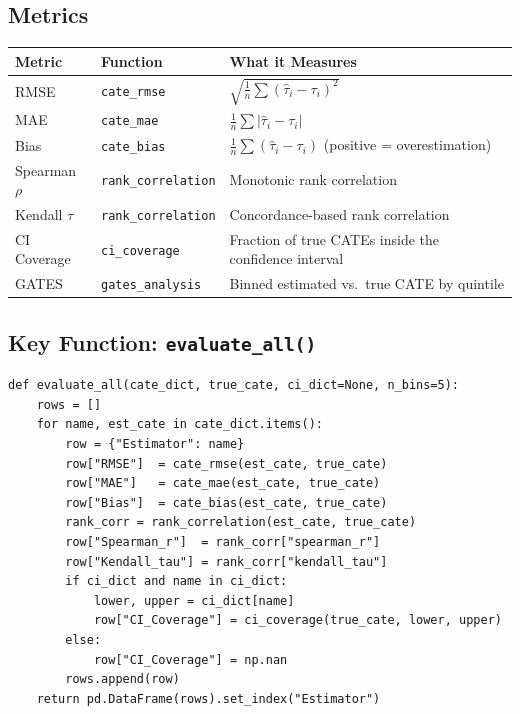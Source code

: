 \documentclass[11pt, letterpaper]{article}
\begin{document}
\subsection{Metrics}

\begin{center}
\begin{tabularx}{\textwidth}{l l X}
    \toprule
    \textbf{Metric} & \textbf{Function} & \textbf{What it Measures} \\
    \midrule
    RMSE          & \texttt{cate\_rmse}       & $\sqrt{\frac{1}{n}\sum(\hat{\tau}_i - \tau_i)^2}$ \\[4pt]
    MAE           & \texttt{cate\_mae}        & $\frac{1}{n}\sum|\hat{\tau}_i - \tau_i|$ \\[4pt]
    Bias          & \texttt{cate\_bias}       & $\frac{1}{n}\sum(\hat{\tau}_i - \tau_i)$ \; (positive = overestimation) \\[4pt]
    Spearman $\rho$ & \texttt{rank\_correlation} & Monotonic rank correlation \\
    Kendall $\tau$  & \texttt{rank\_correlation} & Concordance-based rank correlation \\
    CI Coverage   & \texttt{ci\_coverage}     & Fraction of true CATEs inside the confidence interval \\
    GATES         & \texttt{gates\_analysis}  & Binned estimated vs.\ true CATE by quintile \\
    \bottomrule
\end{tabularx}
\end{center}

\subsection{Key Function: \texttt{evaluate\_all()}}

\begin{lstlisting}[caption={Summary builder: runs all metrics for every estimator.}]
def evaluate_all(cate_dict, true_cate, ci_dict=None, n_bins=5):
    rows = []
    for name, est_cate in cate_dict.items():
        row = {"Estimator": name}
        row["RMSE"]  = cate_rmse(est_cate, true_cate)
        row["MAE"]   = cate_mae(est_cate, true_cate)
        row["Bias"]  = cate_bias(est_cate, true_cate)
        rank_corr = rank_correlation(est_cate, true_cate)
        row["Spearman_r"]  = rank_corr["spearman_r"]
        row["Kendall_tau"] = rank_corr["kendall_tau"]
        if ci_dict and name in ci_dict:
            lower, upper = ci_dict[name]
            row["CI_Coverage"] = ci_coverage(true_cate, lower, upper)
        else:
            row["CI_Coverage"] = np.nan
        rows.append(row)
    return pd.DataFrame(rows).set_index("Estimator")
\end{lstlisting}
\end{document}
